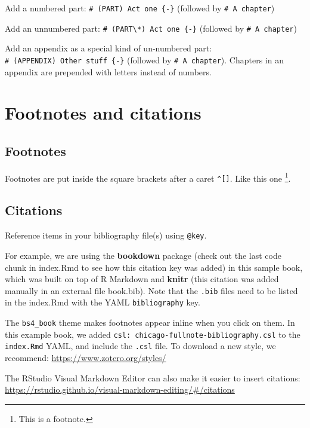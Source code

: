 \documentclass[
]{report}
\theoremstyle{definition}
\theoremstyle{definition}
\theoremstyle{definition}
\theoremstyle{definition}
\theoremstyle{remark}
\begin{document}
Add a numbered part: \texttt{\#\ (PART)\ Act\ one\ \{-\}} (followed by \texttt{\#\ A\ chapter})

Add an unnumbered part: \texttt{\#\ (PART\textbackslash{}*)\ Act\ one\ \{-\}} (followed by \texttt{\#\ A\ chapter})

Add an appendix as a special kind of un-numbered part: \texttt{\#\ (APPENDIX)\ Other\ stuff\ \{-\}} (followed by \texttt{\#\ A\ chapter}). Chapters in an appendix are prepended with letters instead of numbers.

\hypertarget{footnotes-and-citations}{%
\chapter{Footnotes and citations}\label{footnotes-and-citations}}

\hypertarget{footnotes}{%
\section{Footnotes}\label{footnotes}}

Footnotes are put inside the square brackets after a caret \texttt{\^{}{[}{]}}. Like this one \footnote{This is a footnote.}.

\hypertarget{citations}{%
\section{Citations}\label{citations}}

Reference items in your bibliography file(s) using \texttt{@key}.

For example, we are using the \textbf{bookdown} package \citep{R-bookdown} (check out the last code chunk in index.Rmd to see how this citation key was added) in this sample book, which was built on top of R Markdown and \textbf{knitr} \citep{xie2015} (this citation was added manually in an external file book.bib).
Note that the \texttt{.bib} files need to be listed in the index.Rmd with the YAML \texttt{bibliography} key.

The \texttt{bs4\_book} theme makes footnotes appear inline when you click on them. In this example book, we added \texttt{csl:\ chicago-fullnote-bibliography.csl} to the \texttt{index.Rmd} YAML, and include the \texttt{.csl} file. To download a new style, we recommend: \url{https://www.zotero.org/styles/}

The RStudio Visual Markdown Editor can also make it easier to insert citations: \url{https://rstudio.github.io/visual-markdown-editing/\#/citations}
\end{document}
